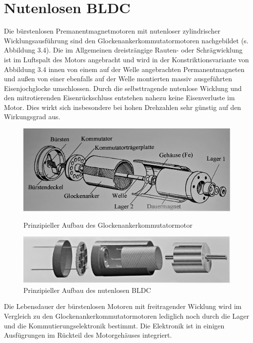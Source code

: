 \section{Nutenlosen BLDC}
Die bürstenlosen Premanentmagnetmotoren mit nutenloser zylindrischer Wicklungsausführung sind den Glockenankerkommutatormotoren nachgebildet (s. Abbildung 3.4). Die im Allgemeinen dreisträngige Rauten- oder Schrägwicklung ist im Luftspalt des Motors angebracht und wird in der Konstriktionsvariante von Abbildung 3.4 innen von einem auf der Welle angebrachten Permanentmagneten und außen von einer ebenfalls auf der Welle montierten massiv ausgeführten Eisenjochglocke umschlossen. Durch die selbsttragende nutenlose Wicklung und den mitrotierenden Eisenrückschluss entstehen nahezu keine Eisenverluste im Motor. Dies wirkt sich insbesondere bei hohen Drehzahlen sehr günstig auf den Wirkungsgrad aus.
\\
\begin{figure}[H]
  \centering
  \includegraphics[width=14cm]{./Grafiken/3_4}
  \caption[Prinzipieller Aufbau des Glockenankerkommutatormotor]{Prinzipieller Aufbau des Glockenankerkommutatormotor \parencite[S. 30]{Stölting2011}}
  \label{fig:3_4}
  \includegraphics[width=14cm]{./Grafiken/3_5}
  \caption[Prinzipieller Aufbau des nutenlosen BLDC]{Prinzipieller Aufbau des nutenlosen BLDC \parencite[S. 78]{Stölting2011}}
  \label{fig:3_5}
\end{figure}
Die Lebensdauer der bürstenlosen Motoren mit freitragender Wicklung wird im Vergleich zu den Glockenankerkommutatormotoren lediglich noch durch die Lager und die Kommutierungselektronik bestimmt. Die Elektronik ist in einigen Ausfügrungen im Rückteil des Motorgehäuses integriert. 
